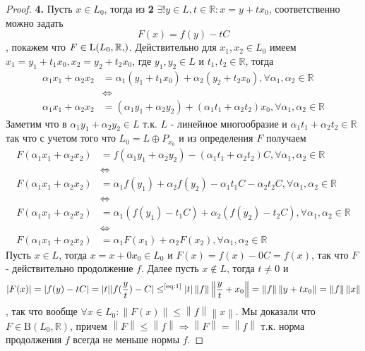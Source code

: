 \documentclass[12pt,a4paper]{article}
\theoremstyle{definition}
\newcommand{\Real}{\mathbb{R}}
\newcommand{\norm}[1]{\left\lVert#1\right\rVert}
\newcommand{\bounded}[2]{\textrm{B}(#1, #2)}
\newcommand{\linear}[2]{\textrm{L}(#1, #2)}
\begin{document}
\begin{proof}
	\textbf{4.} Пусть $x \in L_0$, тогда из \textbf{2} $\exists!{y \in L, t \in \Real}: x = y + tx_0$, соответственно можно задать $$F(x) = f(y) - tC$$, покажем что $F \in \linear{L_0, \Real}$. Действительно для $x_1, x_2 \in L_0$ имеем \newline $x_1 = y_1 + t_1 x_0, x_2 = y_2 + t_2 x_0$, где $y_1, y_2 \in L$ и $t_1, t_2 \in \Real$, тогда
	\begin{align*}
		\alpha_1 x_1 + \alpha_2 x_2 &= \alpha_1 (y_1 + t_1 x_0) + \alpha_2 (y_2 + t_2 x_0), \forall \alpha_1, \alpha_2 \in \Real  \\
		&\Leftrightarrow \\
		\alpha_1 x_1 + \alpha_2 x_2 &= (\alpha_1 y_1 + \alpha_2 y_2) + (\alpha_1 t_1 + \alpha_2 t_2)x_0, \forall \alpha_1, \alpha_2 \in \Real
	\end{align*}
	 Заметим что в $\alpha_1 y_1 + \alpha_2 y_2 \in L$ т.к. $L$ - линейное многообразие \newline и $\alpha_1 t_1 + \alpha_2 t_2 \in \Real$ так что с учетом того что $L_0 = L \oplus P_{x_0}$ и из определения $F$ получаем
	\begin{align*}
		F(\alpha_1 x_1 + \alpha_2 x_2) &= f(\alpha_1 y_1 + \alpha_2 y_2) - (\alpha_1 t_1 + \alpha_2 t_2)C, \forall \alpha_1, \alpha_2 \in \Real \\ &\Leftrightarrow \\    
		F(\alpha_1 x_1 + \alpha_2 x_2) &= \alpha_1 f(y_1) + \alpha_2 f(y_2) - \alpha_1 t_1 C - \alpha_2 t_2 C, \forall \alpha_1, \alpha_2 \in \Real \\ &\Leftrightarrow \\
		F(\alpha_1 x_1 + \alpha_2 x_2) &= \alpha_1 (f(y_1) - t_1 C) + \alpha_2 (f(y_2) - t_2 C), \forall \alpha_1, \alpha_2 \in \Real \\ &\Leftrightarrow \\
		F(\alpha_1 x_1 + \alpha_2 x_2) &= \alpha_1 F(x_1) + \alpha_2 F(x_2), \forall \alpha_1, \alpha_2 \in \Real
	\end{align*}
	Пусть $x\in L$, тогда $x = x + 0x_0 \in L_0$ и $F(x) = f(x) - 0C = f(x)$, так что $F$ - действительно продолжение $f$. Далее пусть $x \notin L$, тогда $t \neq 0$ и 
	$$|F(x)| = |f(y) - tC| = |t||f(\frac{y}{t}) - C| \leq^{\text{\eqref{eq:1}}} |t|\norm{f}\norm{\frac{y}{t} + x_0} = \norm{f}\norm{y + tx_0} = \norm{f}\norm{x}$$, так что вообще $\forall x \in L_0: \norm{F(x)} \leq \norm{f}\norm{x}$. Мы доказали что $F \in \bounded{L_0}{\Real}$, причем $\norm{F} \leq \norm{f} \Rightarrow \norm{F} = \norm{f}$ т.к. норма продолжения $f$ всегда не меньше нормы $f$.
	\newline
	

\end{proof}
\end{document}
